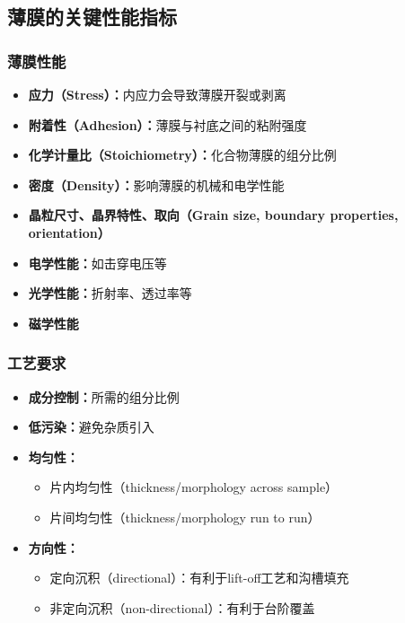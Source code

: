 \documentclass[UTF8,12pt,a4paper]{ctexart}
\begin{document}
\subsection{薄膜的关键性能指标}

\subsubsection{薄膜性能}

\begin{itemize}
    \item \textbf{应力（Stress）：}内应力会导致薄膜开裂或剥离
    \item \textbf{附着性（Adhesion）：}薄膜与衬底之间的粘附强度
    \item \textbf{化学计量比（Stoichiometry）：}化合物薄膜的组分比例
    \item \textbf{密度（Density）：}影响薄膜的机械和电学性能
    \item \textbf{晶粒尺寸、晶界特性、取向（Grain size, boundary properties, orientation）}
    \item \textbf{电学性能：}如击穿电压等
    \item \textbf{光学性能：}折射率、透过率等
    \item \textbf{磁学性能}
\end{itemize}

\subsubsection{工艺要求}

\begin{itemize}
    \item \textbf{成分控制：}所需的组分比例
    \item \textbf{低污染：}避免杂质引入
    \item \textbf{均匀性：}
    \begin{itemize}
        \item 片内均匀性（thickness/morphology across sample）
        \item 片间均匀性（thickness/morphology run to run）
    \end{itemize}
    \item \textbf{方向性：}
    \begin{itemize}
        \item 定向沉积（directional）：有利于lift-off工艺和沟槽填充
        \item 非定向沉积（non-directional）：有利于台阶覆盖
    \end{itemize}
\end{itemize}
\end{document}
